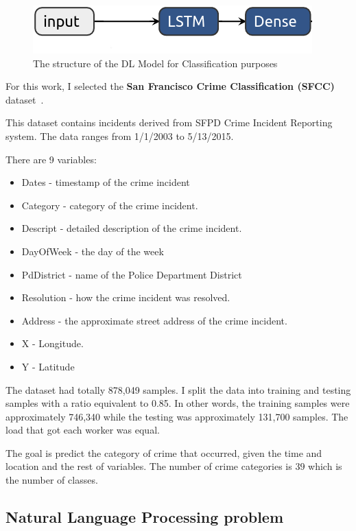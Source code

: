 \begin{figure}[H]
    \centering
    \includegraphics[scale=.3]{./images/impl/class-model.png}
    \caption{The structure of the DL Model for Classification purposes}
    \label{fig:dl_class_model}
\end{figure}

For this work, I selected the \textbf{San Francisco Crime Classification (SFCC)} dataset~\cite{sfc_dataset}.

This dataset contains incidents derived from SFPD Crime Incident Reporting system.
The data ranges from 1/1/2003 to 5/13/2015.

There are 9 variables:

\begin{itemize}
    \item Dates - timestamp of the crime incident
    \item Category - category of the crime incident.
    \item Descript - detailed description of the crime incident.
    \item DayOfWeek - the day of the week
    \item PdDistrict - name of the Police Department District
    \item Resolution - how the crime incident was resolved.
    \item Address - the approximate street address of the crime incident.
    \item X - Longitude.
    \item Y - Latitude
\end{itemize}

The dataset had totally 878,049 samples.
I split the data into training and testing samples with a ratio equivalent to 0.85.
In other words, the training samples were approximately 746,340 while the testing was approximately 131,700 samples.
The load that got each worker was equal.

The goal is predict the category of crime that occurred, given the time and location and the rest of variables.
The number of crime categories is $39$ which is the number of classes.

\subsection{Natural Language Processing problem}\label{subsec:natural-language-processing-problem}

